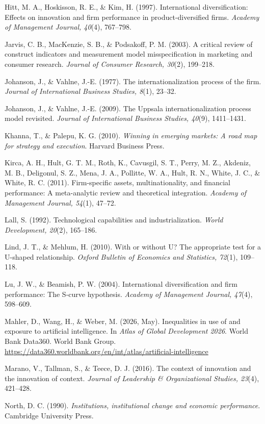 \documentclass[12pt,a4paper]{article}
\begin{document}
Hitt, M. A., Hoskisson, R. E., \& Kim, H. (1997). International
diversification: Effects on innovation and firm performance in
product-diversified firms. \emph{Academy of Management Journal, 40}(4),
767--798.

Jarvis, C. B., MacKenzie, S. B., \& Podsakoff, P. M. (2003). A critical
review of construct indicators and measurement model misspecification in
marketing and consumer research. \emph{Journal of Consumer Research,
30}(2), 199--218.

Johanson, J., \& Vahlne, J.-E. (1977). The internationalization process
of the firm. \emph{Journal of International Business Studies, 8}(1),
23--32.

Johanson, J., \& Vahlne, J.-E. (2009). The Uppsala internationalization
process model revisited. \emph{Journal of International Business
Studies, 40}(9), 1411--1431.

Khanna, T., \& Palepu, K. G. (2010). \emph{Winning in emerging markets:
A road map for strategy and execution}. Harvard Business Press.

Kirca, A. H., Hult, G. T. M., Roth, K., Cavusgil, S. T., Perry, M. Z.,
Akdeniz, M. B., Deligonul, S. Z., Mena, J. A., Pollitte, W. A., Hult, R.
N., White, J. C., \& White, R. C. (2011). Firm-specific assets,
multinationality, and financial performance: A meta-analytic review and
theoretical integration. \emph{Academy of Management Journal, 54}(1),
47--72.

Lall, S. (1992). Technological capabilities and industrialization.
\emph{World Development, 20}(2), 165--186.

Lind, J. T., \& Mehlum, H. (2010). With or without U? The appropriate
test for a U-shaped relationship. \emph{Oxford Bulletin of Economics and
Statistics, 72}(1), 109--118.

Lu, J. W., \& Beamish, P. W. (2004). International diversification and
firm performance: The S-curve hypothesis. \emph{Academy of Management
Journal, 47}(4), 598--609.

Mahler, D., Wang, H., \& Weber, M. (2026, May). Inequalities in use of
and exposure to artificial intelligence. In \emph{Atlas of Global
Development 2026}. World Bank Data360. World Bank Group.
\url{https://data360.worldbank.org/en/int/atlas/artificial-intelligence}

Marano, V., Tallman, S., \& Teece, D. J. (2016). The context of
innovation and the innovation of context. \emph{Journal of Leadership \&
Organizational Studies, 23}(4), 421--428.

North, D. C. (1990). \emph{Institutions, institutional change and
economic performance}. Cambridge University Press.
\end{document}
